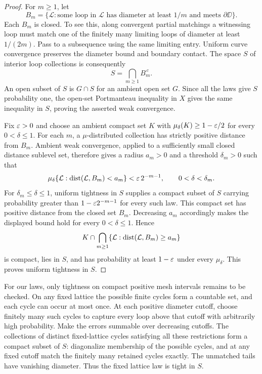 \begin{proof}
For $m\ge1$, let
\[
 B_m=\{\mathcal L:\text{some loop in }\mathcal L
       \text{ has diameter at least }1/m
       \text{ and meets }\partial\DD\}.
\]
Each $B_m$ is closed. To see this, along convergent partial matchings a witnessing loop must match one of the finitely many limiting loops of diameter at least $1/(2m)$. Pass to a subsequence using the same limiting entry. Uniform curve convergence preserves the diameter bound and boundary contact. The space $S$ of interior loop collections is consequently
\begin{equation}\label{eq:interior-space}
 S=\bigcap_{m\ge1}B_m^{\,c}.
\end{equation}
An open subset of $S$ is $G\cap S$ for an ambient open set $G$. Since all the laws give $S$ probability one, the open-set Portmanteau inequality in $X$ gives the same inequality in $S$, proving the asserted weak convergence.

Fix $\varepsilon>0$ and choose an ambient compact set $K$ with $\mu_\delta(K)\ge1-\varepsilon/2$ for every $0<\delta\le1$. For each $m$, a $\mu$-distributed collection has strictly positive distance from $B_m$. Ambient weak convergence, applied to a sufficiently small closed distance sublevel set, therefore gives a radius $a_m>0$ and a threshold $\delta_m>0$ such that
\[
 \mu_\delta\{\mathcal L:\operatorname{dist}(\mathcal L,B_m)<a_m\}
     <\varepsilon\,2^{-m-1},\qquad 0<\delta<\delta_m.
\]
For $\delta_m\le\delta\le1$, uniform tightness in $S$ supplies a compact subset of $S$ carrying probability greater than $1-\varepsilon2^{-m-1}$ for every such law. This compact set has positive distance from the closed set $B_m$. Decreasing $a_m$ accordingly makes the displayed bound hold for every $0<\delta\le1$. Hence
\[
 K\cap\bigcap_{m\ge1}
       \{\mathcal L:\operatorname{dist}(\mathcal L,B_m)\ge a_m\}
\]
is compact, lies in $S$, and has probability at least $1-\varepsilon$ under every $\mu_\delta$. This proves uniform tightness in $S$.
\end{proof}

For our laws, only tightness on compact positive mesh intervals remains to be checked. On any fixed lattice the possible finite cycles form a countable set, and each cycle can occur at most once. At each positive diameter cutoff, choose finitely many such cycles to capture every loop above that cutoff with arbitrarily high probability. Make the errors summable over decreasing cutoffs. The collections of distinct fixed-lattice cycles satisfying all these restrictions form a compact subset of $S$: diagonalize membership of the possible cycles, and at any fixed cutoff match the finitely many retained cycles exactly. The unmatched tails have vanishing diameter. Thus the fixed lattice law is tight in $S$.

